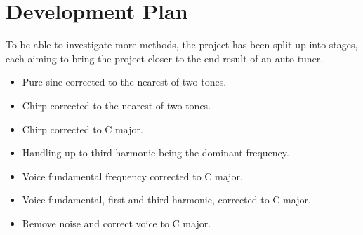 
\chapter{Development Plan}
To be able to investigate more methods, the project has been split up into stages, each aiming to bring the project closer to the end result of an auto tuner.

\begin{itemize}
	\item Pure sine corrected to the nearest of two tones.
	\item Chirp corrected to the nearest of two tones.
	\item Chirp corrected to C major.
	\item Handling up to third harmonic being the dominant frequency.
	\item Voice fundamental frequency corrected to C major.
	\item Voice fundamental, first and third harmonic, corrected to C major.
	\item Remove noise and correct voice to C major.
\end{itemize}

